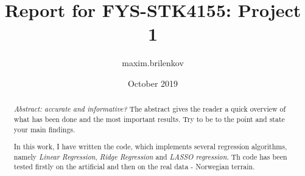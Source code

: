 \documentclass[paper=a4, fontsize=12pt, svgnames]{scrartcl}
\title{Report for FYS-STK4155: Project 1}
\author{maxim.brilenkov }
\date{October 2019}
\begin{document}
\maketitle

\begin{abstract}
    \textit{Abstract: accurate and informative? }
    The abstract gives the reader a quick overview of what has been done and the most important results. Try to be to the point and state your main findings.
    
    In this work, I have written the code, which implements several regression algorithms, namely \textit{Linear Regression}, \textit{Ridge Regression} and \textit{LASSO regression}. Th code has been tested firstly on the artificial and then on the real data - Norwegian terrain.
\end{abstract}












\end{document}
